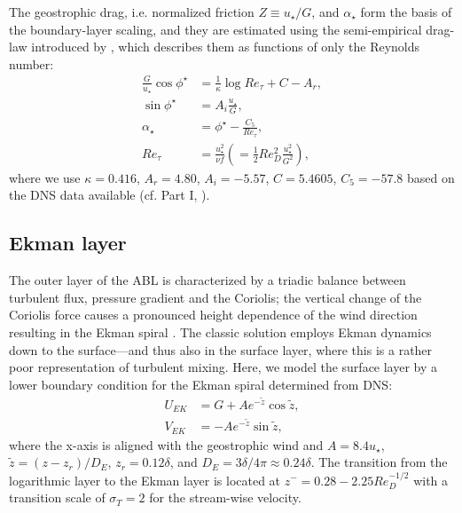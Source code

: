 \documentclass[a4paper,11pt]{article}
\begin{document}
The geostrophic drag, i.e. normalized friction $Z\equiv u_\star/G$, and $\alpha_\star$ form the basis of the boundary-layer scaling, and they are estimated using the semi-empirical drag-law introduced by \cite{spalart1989theoretical}, which describes them as functions of only the Reynolds number:
\begin{subequations}\label{eqn:drag}
	\begin{align}
		\frac{G}{u_\star}\cos\phi^\star &= \frac{1}{\kappa}\log Re_\tau + C - A_r, \\
		\sin\phi^\star &= A_i\frac{u_\star}{G},\\
		\alpha_\star &= \phi^\star - \frac{C_5}{Re_\tau},\\
		Re_\tau &= \frac{u_\star^2}{\nu f} \left( = \frac{1}{2} Re_{D}^2 \frac{u_{\star}^2}{G^2}\right),
	\end{align}
\end{subequations}
where we use $\kappa = 0.416$, $A_r = 4.80$, $A_i = -5.57$, $C = 5.4605$, $C_5 = -57.8$ based on the DNS data available (cf. Part I, \cite{ansorge2014global}).



\subsection{Ekman layer}
\label{sec:ekmanlayer}
The outer layer of the ABL is characterized by a triadic balance between turbulent flux, pressure gradient and the Coriolis; the vertical change of the Coriolis force causes a pronounced height dependence of the wind direction resulting in the Ekman spiral \citep{ekman:AMA1905}. The classic solution employs Ekman dynamics down to the surface---and thus also in the surface layer, where this is a rather poor representation of turbulent mixing. Here, we model the surface layer by a lower boundary condition for the Ekman spiral determined from DNS:
\begin{subequations}
  \begin{align}
    U_{EK} &= G + Ae^{-\tilde{z}}\cos\tilde{z},\\
		V_{EK} &= - Ae^{-\tilde{z}}\sin\tilde{z},
  \end{align}
\end{subequations}
where the x-axis is aligned with the geostrophic wind and $A = 8.4u_\star$, $\tilde{z} = (z-z_r)/D_E$, $z_r = 0.12\delta$, and $D_E = 3\delta/4\pi\approx 0.24\delta$. The transition from the logarithmic layer to the Ekman layer is located at $z^{-}=0.28- 2.25 Re_{D}^{-1/2}$ with a transition scale of $\sigma_T=2$ for the stream-wise velocity.
\end{document}
